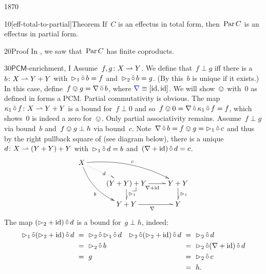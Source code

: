 \begin{parsec}{1870}%
\begin{point}{10}[eff-total-to-partial]{Theorem}%
If~$C$ is an effectus in total form,
then~$\operatorname{Par} C$ is an effectus in partial form.
\begin{point}{20}{Proof}%
In , we saw that~$\operatorname{Par} C$ has finite coproducts.
\begin{point}{30}{$\mathsf{PCM}$-enrichment, I}%
Assume~$f,g \colon X \rightharpoonup Y$.
We define that~$f \perp g$
    iff there is a ~$b\colon X \rightharpoonup Y+Y$
    with~$\mathord{\vartriangleright}_1 \mathop{\hat\circ} b = f$
    and~$\mathord{\vartriangleright}_2 \mathop{\hat\circ} b = g$.
    (By 
    this~$b$ is unique if it exists.)
In this case, define~$f \ovee g = \nabla \mathop{\hat\circ} b$,
where $\Define{\nabla} \equiv [\id,\id]$.
We will show~$\ovee$ with~$0$
    as defined in 
    forms a PCM.
Partial commutativity is obvious.
The map~$\kappa_1 \mathop{\hat\circ} f\colon X \rightharpoonup Y+Y$
    is a bound for~$f \perp 0$ and
    so~$f \ovee 0 = \nabla \mathop{\hat\circ} \kappa_1 \mathop{\hat\circ} f = f$,
    which shows~$0$
    is indeed a zero for~$\ovee$.
Only partial associativity remains.
Assume~$f \perp g$ via bound~$b$
and~$f \ovee g \perp h$ via bound~$c$.
Note~$\nabla \mathop{\hat\circ} b = f \ovee g = \mathord{\vartriangleright}_1 \mathop{\hat\circ} c$
and thus by the right pullback square of  (see diagram below),
    there is a unique~$d\colon X \rightharpoonup (Y+Y)+Y$
    with~$\mathord{\vartriangleright}_1 \mathop{\hat\circ} d = b$ and~$(\nabla +\operatorname{id})\mathop{\hat\circ} d = c$.
\begin{equation*}
    \xymatrix@R-.8pc{
    X \ar@^{.>}[rd]|d
        \ar@/^1pc/[rrd]^c
        \ar@/_1pc/[rdd]_b
        \\& (Y+Y)+Y \pullback
        \ar@^{>}[r]_{\nabla+\id}
        \ar@^{>}[d]^{\pproj_1}
    & Y+Y
        \ar@^{>}[d]^{\pproj_1}
    \\& Y+Y
        \ar@^{>}[r]_{\nabla}
&Y
}
\end{equation*}
The map $(\mathord{\vartriangleright}_2 + \operatorname{id}) \mathop{\hat\circ} d$
    is a bound for~$g \perp h$,
    indeed:
\begin{align*}
    \pproj_1 \hafter (\pproj_2 + \id) \hafter d
    & \ =\  \pproj_2 \hafter \pproj_1 \hafter d 
    & \pproj_2 \hafter (\pproj_2 + \id) \hafter d
    & \ =\  \pproj_2 \hafter d
    \\
    &\ =\  \pproj_2 \hafter b
    && \ =\  \pproj_2 \hafter (\nabla + \id) \hafter d
    \\
    & \ =\  g
    && \ = \ \pproj_2 \hafter c\\
    &&& \ = \ h.

\end{align*}
\end{point}
\end{point}
\end{point}
\end{parsec}
